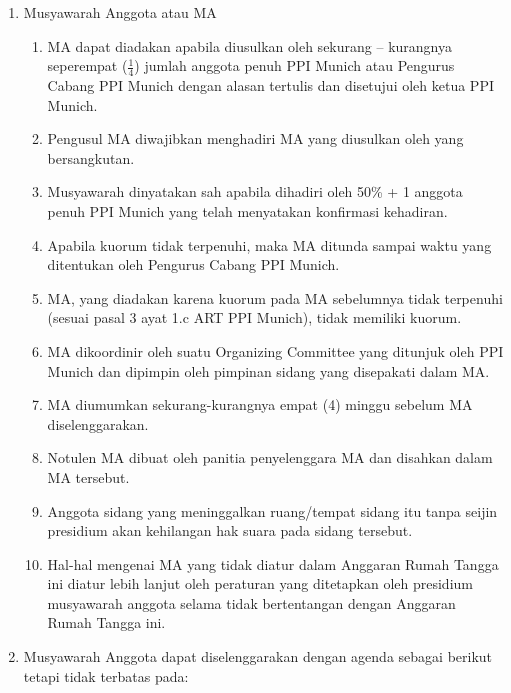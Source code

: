 \documentclass{article}
\begin{document}
\begin{enumerate}
    \item {
        Musyawarah Anggota atau MA
        \begin{enumerate}
            \item {
                MA dapat diadakan apabila diusulkan oleh sekurang – kurangnya seperempat ($\frac{1}{4}$) jumlah anggota penuh PPI Munich atau Pengurus Cabang PPI Munich dengan alasan tertulis dan disetujui oleh ketua PPI Munich. 
            }
            \item {
                Pengusul MA diwajibkan menghadiri MA yang diusulkan oleh yang bersangkutan.
            }
            \item {
                Musyawarah dinyatakan sah apabila dihadiri oleh 50\% + 1 anggota penuh PPI Munich yang telah menyatakan konfirmasi kehadiran.
            }
            \item {
                Apabila kuorum tidak terpenuhi, maka MA ditunda sampai waktu yang ditentukan oleh Pengurus Cabang PPI Munich. 
            }
            \item {
                MA, yang diadakan karena kuorum pada MA sebelumnya tidak terpenuhi (sesuai pasal 3 ayat 1.c ART PPI Munich), tidak memiliki kuorum.
            }
            \item {
                MA dikoordinir oleh suatu Organizing Committee yang ditunjuk oleh PPI Munich dan dipimpin oleh pimpinan sidang yang disepakati dalam MA.
            }
            \item {
                MA diumumkan sekurang-kurangnya empat (4) minggu sebelum MA diselenggarakan.
            }
            \item {
                Notulen MA dibuat oleh panitia penyelenggara MA dan disahkan dalam MA tersebut.
            }
            \item {
                Anggota sidang yang meninggalkan ruang/tempat sidang itu tanpa seijin presidium akan kehilangan hak suara pada sidang tersebut.
            }
            \item {
                Hal-hal mengenai MA yang tidak diatur dalam Anggaran Rumah Tangga ini diatur lebih lanjut oleh peraturan yang ditetapkan oleh presidium musyawarah anggota selama tidak bertentangan dengan Anggaran Rumah Tangga ini.
            }
        \end{enumerate}
    }
    \item {
        Musyawarah Anggota dapat diselenggarakan dengan agenda sebagai berikut tetapi tidak terbatas pada:
}
\end{enumerate}
\end{document}
